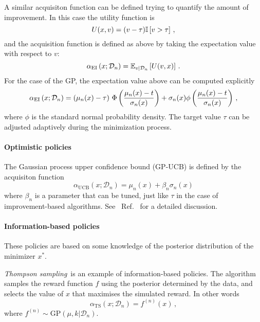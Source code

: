 A similar acquisiton function can be defined trying to quantify the amount of
improvement. In this case the utility function is
\begin{equation}
    \label{eq:EIUtil}
    U(x,v) = (v-\tau) \mathbb{I}\left[v>\tau\right]\, ,
\end{equation}
and the acquisition function is defined as above by taking the expectation value with respect to $v$:
\begin{equation}
    \label{eq:EIAcq}
    \alpha_{\mathrm{EI}} \left(x;\mathcal{D}_n\right) =
    \mathbb{E}_{v|\mathcal{D}_n}\left[U(v,x)\right]\, .
\end{equation}
For the case of the GP, the expectation value above can be computed explicitly
\begin{equation}
    \label{eq:EIAcqGP}
    \alpha_{\mathrm{EI}} \left(x;\mathcal{D}_n\right) =
    \left(\mu_n(x)-\tau\right) \,
    \Phi\left(\frac{\mu_n(x)-t}{\sigma_n(x)}\right)
    + \sigma_n(x) \phi\left(\frac{\mu_n(x)-t}{\sigma_n(x)}\right)\, ,
\end{equation}
where $\phi$ is the standard normal probability density. The target value $\tau$
can be adjusted adaptively during the minimization process.

\paragraph[]{Optimistic policies}

The Gaussian process upper confidence bound (GP-UCB) is defined by the
acquisiton function
\begin{equation}
    \label{eq:GB-UCB}
    \alpha_\mathrm{UCB}\left(x;\mathcal{D}_n\right) =
        \mu_n(x) + \beta_n \sigma_n(x)
\end{equation}
where $\beta_n$ is a parameter that can be tuned, just like $\tau$ in the case
of improvement-based algorithms. See \eg\ Ref.~\cite{Srinivas_2012} for a
detailed discussion.

\paragraph[]{Information-based policies}

These policies are based on some knowledge of the posterior distribution of the minimizer $x^*$.

{\em Thompson sampling}\ is an example of information-based policies. The
algorithm samples the reward function $f$ using the posterior determined by the
data, and selects the value of $x$ that maximises the simulated reward. In other words
\begin{equation}
    \label{eq:TSAcq}
    \alpha_\mathrm{TS}\left(x;\mathcal{D}_n\right) =
    f^{(n)}(x)\, ,
\end{equation}
where $f^{(n)}\sim \mathrm{GP}\left(\mu,k|\mathcal{D}_n\right)$.

